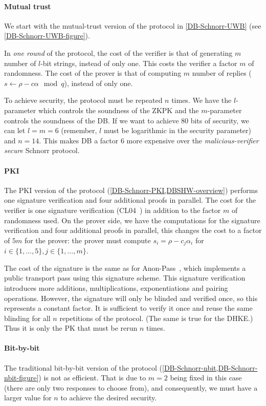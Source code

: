 \paragraph*{Mutual trust}

We start with the mutual-trust version of the protocol in \cref{DB-Schnorr-UWB} 
(see \cref{DB-Schnorr-UWB-figure}).

In \emph{one round} of the protocol, the cost of the verifier is that of 
generating \(m\) number of \(l\)-bit strings, instead of only one.
This costs the verifier a factor \(m\) of randomness.
The cost of the prover is that of computing \(m\) number of replies (\(s\gets 
\rho - c \alpha \mod q\)), instead of only one.

To achieve security, the protocol must be repeated \(n\) times.
We have the \(l\)-parameter which controls the soundness of the \ac{ZKPK} and 
the \(m\)-parameter controls the soundness of the \acl{DB}.
If we want to achieve 80 bits of security, we can let \(l = m = 6\) (remember, 
\(l\) must be logarithmic in the security parameter) and \(n = 14\).
This makes \acl{DB} a factor \(6\) more expensive over the 
\emph{malicious-verifier secure} Schnorr protocol.

\paragraph*{\acs*{PKI}}

The \ac{PKI} version of the protocol (\cref{DB-Schnorr-PKI,DBSHW-overview}) 
performs one signature verification and four additional proofs in parallel.
The cost for the verifier is one signature verification 
(CL04~\cite{CLsignatures}) in addition to the factor \(m\) of randomness used.
On the prover side, we have the computations for the signature verification and 
four additional proofs in parallel, this changes the cost to a factor of \(5m\) 
for the prover: the prover must compute \(s_i = \rho - c_j \alpha_i\) for 
\(i\in \{1, \dotsc, 5\}, j\in \{1, \dotsc, m\}\).

The cost of the signature is the same as for Anon-Pass~\cite{AnonPass}, which 
implements a public transport pass using this signature scheme.
This signature verification introduces more additions, multiplications, 
exponentiations and pairing operations.
However, the signature will only be blinded and verified once, so this 
represents a constant factor.
It is sufficient to verify it once and reuse the same blinding for all \(n\) 
repetitions of the protocol.
(The same is true for the \ac{DHKE}.)
Thus it is only the \acl{PK} that must be rerun \(n\) times.

\paragraph*{Bit-by-bit}

The traditional bit-by-bit version of the protocol 
(\cref{DB-Schnorr-nbit,DB-Schnorr-nbit-figure}) is not as efficient.
That is due to \(m = 2\) being fixed in this case (there are only two responses 
to choose from), and consequently, we must have a larger value for \(n\) to 
achieve the desired security.

